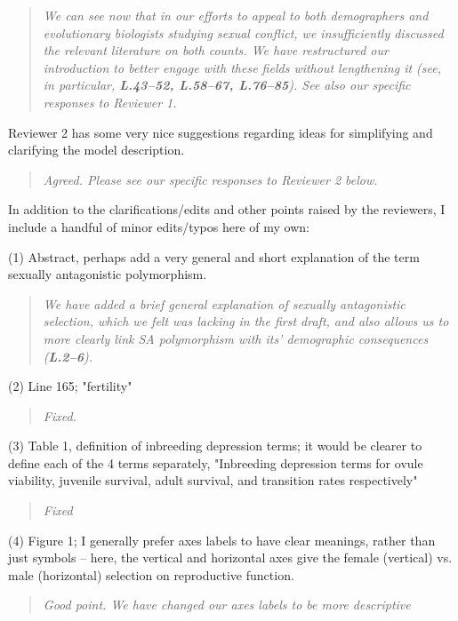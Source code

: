 \documentclass[11pt]{article}
\begin{document}
\begin{quote}
	{\itshape We can see now that in our efforts to appeal to both demographers and evolutionary biologists studying sexual conflict, we insufficiently discussed the relevant literature on both counts. We have restructured our introduction to better engage with these fields without lengthening it (see, in particular, {\bf L.43--52, L.58--67, L.76--85}). See also our specific responses to Reviewer 1. }
\end{quote}


Reviewer 2 has some very nice suggestions regarding ideas for simplifying and clarifying the model description.

\begin{quote}
	{\itshape Agreed. Please see our specific responses to Reviewer 2 below.}
\end{quote}

In addition to the clarifications/edits and other points raised by the reviewers, I include a handful of minor edits/typos here of my own:
\bigskip

\noindent (1) Abstract, perhaps add a very general and short explanation of the term sexually antagonistic polymorphism.
\begin{quote}
	{\itshape We have added a brief general explanation of sexually antagonistic selection, which we felt was lacking in the first draft, and also allows us to more clearly link SA polymorphism with its' demographic consequences ({\bf L.2--6}).}
\end{quote}

\noindent (2) Line 165; "fertility"
\begin{quote}
	{\itshape Fixed.}
\end{quote}

\noindent (3) Table 1, definition of inbreeding depression terms; it would be clearer to define each of the 4 terms separately, "Inbreeding depression terms for ovule viability, juvenile survival, adult survival, and transition rates respectively"
\begin{quote}
	{\itshape Fixed}
\end{quote}

\noindent (4) Figure 1; I generally prefer axes labels to have clear meanings, rather than just symbols – here, the vertical and horizontal axes give the female (vertical) vs. male (horizontal) selection on reproductive function.
\begin{quote}
	{\itshape Good point. We have changed our axes labels to be more descriptive }
\end{quote}
\end{document}

